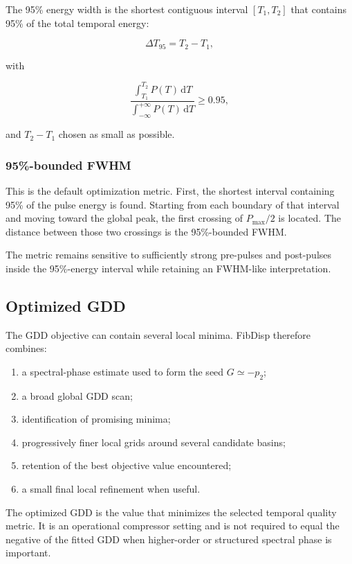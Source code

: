 \documentclass[11pt,a4paper]{article}
\newcommand{\dd}{\mathrm{d}}
\begin{document}
The 95\% energy width is the shortest contiguous interval $[T_1,T_2]$ that
contains 95\% of the total temporal energy:

\begin{equation}
\boxed{
\Delta T_{95}=T_2-T_1,
}
\end{equation}

with

\begin{equation}
\frac{\int_{T_1}^{T_2}P(T)\,\dd T}
     {\int_{-\infty}^{+\infty}P(T)\,\dd T}
\ge0.95,
\end{equation}

and $T_2-T_1$ chosen as small as possible.

\subsubsection{95\%-bounded FWHM}

This is the default optimization metric. First, the shortest interval
containing 95\% of the pulse energy is found. Starting from each boundary of
that interval and moving toward the global peak, the first crossing of
$P_{\max}/2$ is located. The distance between those two crossings is the
95\%-bounded FWHM.

The metric remains sensitive to sufficiently strong pre-pulses and post-pulses
inside the 95\%-energy interval while retaining an FWHM-like interpretation.

\subsection{Optimized GDD}

The GDD objective can contain several local minima. FibDisp therefore combines:

\begin{enumerate}
    \item a spectral-phase estimate used to form the seed
    $G\simeq-p_2$;
    \item a broad global GDD scan;
    \item identification of promising minima;
    \item progressively finer local grids around several candidate basins;
    \item retention of the best objective value encountered;
    \item a small final local refinement when useful.
\end{enumerate}

The optimized GDD is the value that minimizes the selected temporal quality
metric. It is an operational compressor setting and is not required to equal
the negative of the fitted GDD when higher-order or structured spectral phase
is important.
\end{document}
